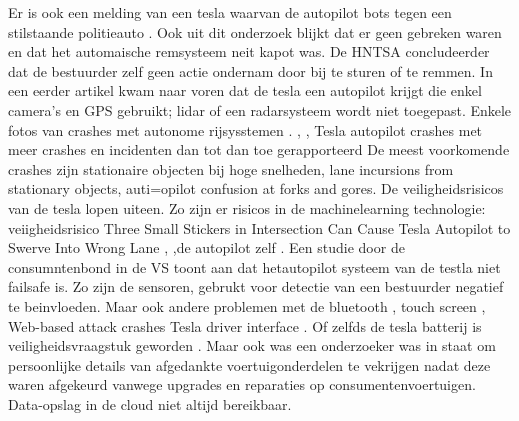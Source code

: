 \cite{tiungteslasoftwarecrash}
Er is ook een melding van een tesla waarvan de autopilot bots tegen een stilstaande politieauto
\cite{kierstein18032021teslaAutopilotCrashStationary}. Ook uit dit onderzoek blijkt dat er geen gebreken waren en dat het automaische remsysteem neit kapot was. De HNTSA concludeerder dat de bestuurder zelf geen actie ondernam door  bij te sturen of te remmen. In een eerder artikel kwam naar voren dat de tesla een autopilot krijgt die enkel camera's en GPS gebruikt; lidar of een radarsysteem wordt niet toegepast.
\cite{janssen20062017teslacrashdetailflorida}
Enkele fotos van crashes met autonome rijsysstemen \cite{saferoardsCrashesAutonomousvehicles}.
\cite{stephardson18032021revieuwingtesla}
\cite{habib28062016NHTSATeslaReport},
\cite{darkReading17112020TeslaBackup},
\cite{heilweil26022020teslaAutopilot}
Tesla autopilot crashes met meer crashes en incidenten dan tot dan toe gerapporteerd
\cite{teslaFDSCrash}
De meest voorkomende crashes zijn stationaire objecten bij hoge snelheden, lane incursions from stationary objects, auti=opilot confusion at forks and gores.
\cite{teslaCrashesCauses}
\cite{teslacrashOvervieuw}
\cite{tesladeaths}
De veiligheidsrisicos van de tesla lopen uiteen. Zo zijn er risicos in de machinelearning technologie:
veiigheidsrisico Three Small Stickers in Intersection Can Cause Tesla Autopilot to Swerve Into Wrong Lane
\cite{evan01042019teslaautopilotIntersection},
\cite{lambert31062020q2safetyreport},de autopilot zelf
\cite{templeton06092019HTSBReportTesla}. Een studie door de consumntenbond in de VS toont aan dat hetautopilot systeem van de testla niet failsafe is. Zo zijn de sensoren, gebrukt voor detectie van een bestuurder negatief te beinvloeden.
\cite{dowling23042021autopilottricking} Maar ook andere problemen met de bluetooth 
\cite{wiredBloutoothHackTesla}, touch screen
\cite{preston14012021NHTSATeslaRecall},
Web-based attack crashes Tesla driver interface
\cite{leyden23032020TeslaInterfaceHack}.
Of zelfds de tesla batterij is veiligheidsvraagstuk geworden
\cite{mitchell01072020teslabatterycooling}.
Maar ook was een onderzoeker  was in staat om persoonlijke details van afgedankte voertuigonderdelen  te vekrijgen nadat deze waren afgekeurd vanwege upgrades en reparaties op consumentenvoertuigen.
\cite{stumpff04052020TeslaPersonalData}
Data-opslag in de cloud niet altijd bereikbaar.
\cite{mitchell24022020AIDataTesla}
